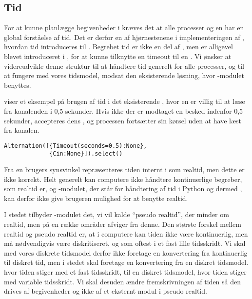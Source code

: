 \subsection{Tid} \label{sec:tid}
For at kunne planlægge begivenheder i \des kræves det at alle processer og \sched en har en global forståelse af tid.  Det er derfor en af hjørnestenene i implementeringen af \des, hvordan tid introduceres til \pycsp.  
Begrebet tid er ikke en del af \csp, men er alligevel blevet introduceret i \pycsp, for  at  kunne tilknytte en timeout til en . Vi ønsker
at videreudvikle denne struktur til at håndtere tid generelt for alle
processer, og til at fungere med vores tidsmodel, modsat den eksisterende
løsning, hvor -modulet benyttes.
 
 viser et eksempel på brugen af tid i det eksisterende \pycsp, hvor en  er villig
til at læse fra kanalenden  i 0,5 sekunder. Hvis ikke der
er modtaget en besked indenfor 0,5 sekunder, accepteres dens ,
og processen fortsætter sin kørsel uden at have læst fra kanalen.

\begin{lstlisting}[float=hbtp, 
label=Timeout,caption=Timeout i Alternation (fra dokumentationen til PyCSP)]
Alternation([{Timeout(seconds=0.5):None}, 
             {Cin:None}]).select()
\end{lstlisting}

Fra en brugers synsvinkel repræsenteres tiden internt i \pycsp som realtid, men dette er ikke korrekt. Helt generelt kan computere ikke håndtere kontinuerlige begreber, som realtid er, og -modulet, der står for håndtering af tid i Python og dermed \pycsp, kan derfor ikke give brugeren mulighed for at benytte realtid. 

 I stedet tilbyder -modulet det, vi vil kalde ``pseudo realtid'', der minder om realtid, men på en række områder afviger fra denne. Den største forskel mellem realtid og pseudo realtid er, at i computere kan tiden ikke være kontinuerlig, men må nødvendigvis være diskritiseret, og som oftest i et fast lille tidsskridt. Vi skal med vores diskrete tidsmodel derfor ikke foretage en konvertering fra kontinuerlig til diskret tid, men i stedet skal foretage en konvertering fra en diskret tidsmodel. hvor tiden stiger med et fast tidsskridt, til en diskret tidsmodel, hvor tiden stiger med variable tidsskridt. Vi skal desuden ændre fremskrivningen af tiden så den  drives af begivenheder og ikke af et eksternt modul i pseudo realtid. 
 
